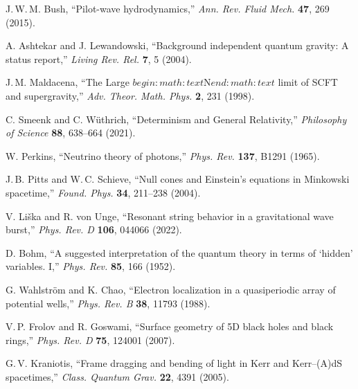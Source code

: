 \documentclass[reprint,amsmath,amssymb,aps]{revtex4-2}
\begin{document}
\begin{thebibliography}{99}
J.\,W.\,M. Bush, ``Pilot-wave hydrodynamics,'' \emph{Ann. Rev. Fluid Mech.} \textbf{47}, 269 (2015).

A. Ashtekar and J. Lewandowski, ``Background independent quantum gravity: A status report,'' \emph{Living Rev. Rel.} \textbf{7}, 5 (2004).

J.\,M. Maldacena, ``The Large $begin:math:text$N$end:math:text$ limit of SCFT and supergravity,'' \emph{Adv. Theor. Math. Phys.} \textbf{2}, 231 (1998).

C. Smeenk and C. W\"uthrich, ``Determinism and General Relativity,'' \emph{Philosophy of Science} \textbf{88}, 638–664 (2021).

W. Perkins, ``Neutrino theory of photons,'' \emph{Phys. Rev.} \textbf{137}, B1291 (1965).

J.\,B. Pitts and W.\,C. Schieve, ``Null cones and Einstein’s equations in Minkowski spacetime,'' \emph{Found. Phys.} \textbf{34}, 211–238 (2004).

V. Li\v{s}ka and R. von Unge, ``Resonant string behavior in a gravitational wave burst,'' \emph{Phys. Rev. D} \textbf{106}, 044066 (2022).

D. Bohm, ``A suggested interpretation of the quantum theory in terms of ‘hidden’ variables. I,'' \emph{Phys. Rev.} \textbf{85}, 166 (1952).

G. Wahlstr\"om and K. Chao, ``Electron localization in a quasiperiodic array of potential wells,'' \emph{Phys. Rev. B} \textbf{38}, 11793 (1988).

V.\,P. Frolov and R. Goswami, ``Surface geometry of 5D black holes and black rings,'' \emph{Phys. Rev. D} \textbf{75}, 124001 (2007).

G.\,V. Kraniotis, ``Frame dragging and bending of light in Kerr and Kerr–(A)dS spacetimes,'' \emph{Class. Quantum Grav.} \textbf{22}, 4391 (2005).

\end{thebibliography}
\end{document}
